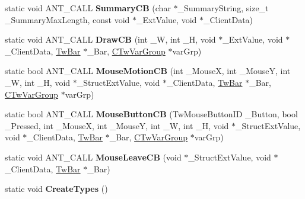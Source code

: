 \begin{DoxyCompactItemize}
\item 
\hypertarget{struct_c_quaternion_ext_abea81b778a03b858518b5d0043029a0f}{static void A\+N\+T\+\_\+\+C\+A\+L\+L {\bfseries Summary\+C\+B} (char $\ast$\+\_\+\+Summary\+String, size\+\_\+t \+\_\+\+Summary\+Max\+Length, const void $\ast$\+\_\+\+Ext\+Value, void $\ast$\+\_\+\+Client\+Data)}\label{struct_c_quaternion_ext_abea81b778a03b858518b5d0043029a0f}

\item 
\hypertarget{struct_c_quaternion_ext_a4c9389e4474c360a8c1cc1b85d7a3530}{static void A\+N\+T\+\_\+\+C\+A\+L\+L {\bfseries Draw\+C\+B} (int \+\_\+\+W, int \+\_\+\+H, void $\ast$\+\_\+\+Ext\+Value, void $\ast$\+\_\+\+Client\+Data, \hyperlink{struct_c_tw_bar}{Tw\+Bar} $\ast$\+\_\+\+Bar, \hyperlink{struct_c_tw_var_group}{C\+Tw\+Var\+Group} $\ast$var\+Grp)}\label{struct_c_quaternion_ext_a4c9389e4474c360a8c1cc1b85d7a3530}

\item 
\hypertarget{struct_c_quaternion_ext_a62284cd7b06ca23ee4f68dba693a4426}{static bool A\+N\+T\+\_\+\+C\+A\+L\+L {\bfseries Mouse\+Motion\+C\+B} (int \+\_\+\+Mouse\+X, int \+\_\+\+Mouse\+Y, int \+\_\+\+W, int \+\_\+\+H, void $\ast$\+\_\+\+Struct\+Ext\+Value, void $\ast$\+\_\+\+Client\+Data, \hyperlink{struct_c_tw_bar}{Tw\+Bar} $\ast$\+\_\+\+Bar, \hyperlink{struct_c_tw_var_group}{C\+Tw\+Var\+Group} $\ast$var\+Grp)}\label{struct_c_quaternion_ext_a62284cd7b06ca23ee4f68dba693a4426}

\item 
\hypertarget{struct_c_quaternion_ext_a6a7c601477d3407004d3edc149f1c066}{static bool A\+N\+T\+\_\+\+C\+A\+L\+L {\bfseries Mouse\+Button\+C\+B} (Tw\+Mouse\+Button\+I\+D \+\_\+\+Button, bool \+\_\+\+Pressed, int \+\_\+\+Mouse\+X, int \+\_\+\+Mouse\+Y, int \+\_\+\+W, int \+\_\+\+H, void $\ast$\+\_\+\+Struct\+Ext\+Value, void $\ast$\+\_\+\+Client\+Data, \hyperlink{struct_c_tw_bar}{Tw\+Bar} $\ast$\+\_\+\+Bar, \hyperlink{struct_c_tw_var_group}{C\+Tw\+Var\+Group} $\ast$var\+Grp)}\label{struct_c_quaternion_ext_a6a7c601477d3407004d3edc149f1c066}

\item 
\hypertarget{struct_c_quaternion_ext_a0b2211bbc40a497198e54715c990421a}{static void A\+N\+T\+\_\+\+C\+A\+L\+L {\bfseries Mouse\+Leave\+C\+B} (void $\ast$\+\_\+\+Struct\+Ext\+Value, void $\ast$\+\_\+\+Client\+Data, \hyperlink{struct_c_tw_bar}{Tw\+Bar} $\ast$\+\_\+\+Bar)}\label{struct_c_quaternion_ext_a0b2211bbc40a497198e54715c990421a}

\item 
\hypertarget{struct_c_quaternion_ext_a50cfbeaabc5f3543185eef1a7f662dbe}{static void {\bfseries Create\+Types} ()}\label{struct_c_quaternion_ext_a50cfbeaabc5f3543185eef1a7f662dbe}


\end{DoxyCompactItemize}

